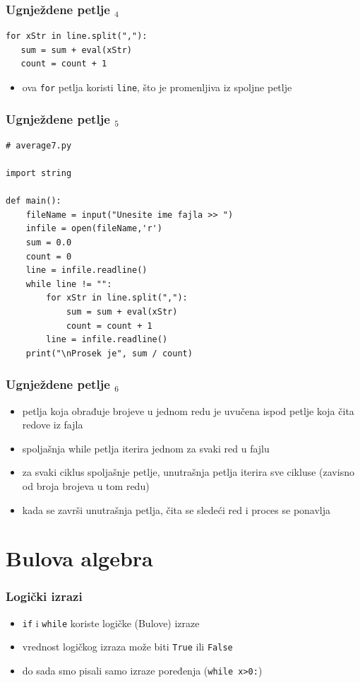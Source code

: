 \documentclass[utf8,compress]{beamer}
\begin{document}
\begin{frame}[fragile]
  \frametitle{Ugnježdene petlje $_4$}
\begin{verbatim}
for xStr in line.split(","):
   sum = sum + eval(xStr)
   count = count + 1
\end{verbatim}
  \begin{itemize}
    \item ova \texttt{for} petlja koristi \texttt{line}, što je promenljiva iz spoljne petlje
  \end{itemize}
\end{frame}

\begin{frame}[fragile,shrink=5]
  \frametitle{Ugnježdene petlje $_5$}
\begin{verbatim}
# average7.py

import string

def main():
    fileName = input("Unesite ime fajla >> ")
    infile = open(fileName,'r')
    sum = 0.0
    count = 0
    line = infile.readline()
    while line != "":
        for xStr in line.split(","):
            sum = sum + eval(xStr)
            count = count + 1
        line = infile.readline()
    print("\nProsek je", sum / count)

\end{verbatim}
\end{frame}

\begin{frame}[fragile]
  \frametitle{Ugnježdene petlje $_6$}
  \begin{itemize}
    \item petlja koja obrađuje brojeve u jednom redu je uvučena ispod petlje koja čita redove iz fajla
    \item spoljašnja while petlja iterira jednom za svaki red u fajlu
    \item za svaki ciklus spoljašnje petlje, unutrašnja petlja iterira sve cikluse (zavisno od broja brojeva u tom redu)
    \item kada se završi unutrašnja petlja, čita se sledeći red i proces se ponavlja
  \end{itemize}
\end{frame}

\section{Bulova algebra}

\begin{frame}[fragile]
  \frametitle{Logički izrazi}
  \begin{itemize}
    \item \texttt{if} i \texttt{while} koriste logičke (Bulove) izraze
    \item vrednost logičkog izraza može biti \texttt{True} ili \texttt{False}
    \item do sada smo pisali samo izraze poređenja (\texttt{while x>0:})
  \end{itemize}
\end{frame}
\end{document}
